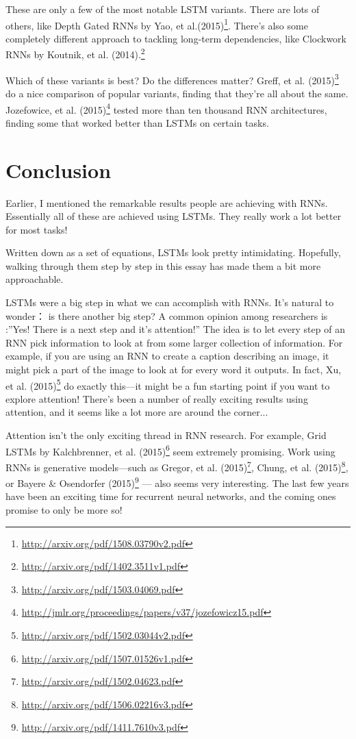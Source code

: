 \documentclass[12pt]{article} %
\begin{document}
These are only a few of the most notable LSTM variants. There are lots of others, like Depth Gated RNNs by Yao, et al.(2015)\footnote{\url{http://arxiv.org/pdf/1508.03790v2.pdf}}. There's also some completely different approach to tackling long-term dependencies, like Clockwork RNNs by Koutnik, et al. (2014).\footnote{\url{http://arxiv.org/pdf/1402.3511v1.pdf}}

Which of these variants is best? Do the differences matter? Greff, et al. (2015)\footnote{\url{http://arxiv.org/pdf/1503.04069.pdf}} do a nice comparison of popular variants, finding that they're all about the same. Jozefowice, et al. (2015)\footnote{\url{http://jmlr.org/proceedings/papers/v37/jozefowicz15.pdf}} tested more than ten thousand RNN architectures, finding some that worked better than LSTMs on certain tasks.

\section{Conclusion}

Earlier, I mentioned the remarkable results people are achieving with RNNs. Essentially all of these are achieved using LSTMs. They really work a lot better for most tasks!

Written down as a set of equations, LSTMs look pretty intimidating. Hopefully, walking through them step by step in this essay has made them a bit more approachable.

LSTMs were a big step in what we can accomplish with RNNs. It's natural to wonder： is there another big step? A common opinion among researchers is :''Yes! There is a next step and it's attention!'' The idea is to let every step of an RNN pick information to look at from some larger collection of information. For example, if you are using an RNN to create a caption describing an image, it might pick a part of the image to look at for every word it outputs. In fact, Xu, et al. (2015)\footnote{\url{http://arxiv.org/pdf/1502.03044v2.pdf}} do exactly this---it might be a fun starting point if you want to explore attention! There's been a number of really exciting results using attention, and it seems like a lot more are around the corner...

Attention isn't the only exciting thread in RNN research. For example, Grid LSTMs by Kalchbrenner, et al. (2015)\footnote{\url{http://arxiv.org/pdf/1507.01526v1.pdf}} seem extremely promising. Work using RNNs is generative models---such as Gregor, et al. (2015)\footnote{\url{http://arxiv.org/pdf/1502.04623.pdf}}, Chung, et al. (2015)\footnote{\url{http://arxiv.org/pdf/1506.02216v3.pdf}}, or Bayere \& Osendorfer (2015)\footnote{\url{http://arxiv.org/pdf/1411.7610v3.pdf}} --- also seems very interesting. The last few years have been an exciting time for recurrent neural networks, and the coming ones promise to only be more so!
\end{document}
